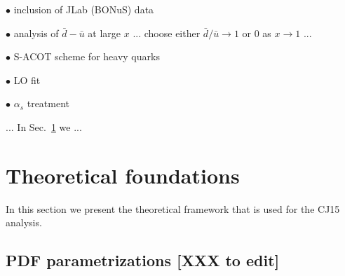 \documentclass[aps,prd,amsmath,preprint]{revtex4}
\begin{document}
$\bullet$
inclusion of JLab (BONuS) data

$\bullet$
analysis of $\bar d - \bar u$ at large $x$ ... choose either
$\bar d/\bar u \to 1$ or 0 as $x \to 1$ ...

$\bullet$
S-ACOT scheme for heavy quarks

$\bullet$
LO fit

$\bullet$
$\alpha_s$ treatment



... In Sec.~\ref{sec:thy} we ...




\section{Theoretical foundations}
\label{sec:thy}

In this section we present the theoretical framework that is used for
the CJ15 analysis.


\subsection{PDF parametrizations {\color{red} [XXX to edit]}}
\label{ssec:parametrizations}
\end{document}
